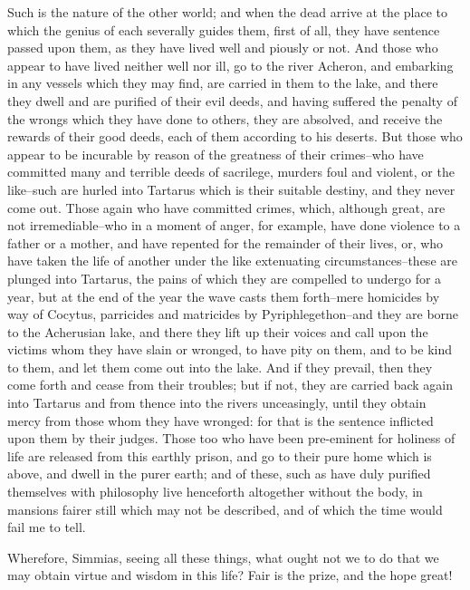 Such is the nature of the other world; and when the dead arrive at the
place to which the genius of each severally guides them, first of all,
they have sentence passed upon them, as they have lived well and piously
or not. And those who appear to have lived neither well nor ill, go to
the river Acheron, and embarking in any vessels which they may find, are
carried in them to the lake, and there they dwell and are purified of
their evil deeds, and having suffered the penalty of the wrongs which
they have done to others, they are absolved, and receive the rewards of
their good deeds, each of them according to his deserts. But those who
appear to be incurable by reason of the greatness of their crimes--who
have committed many and terrible deeds of sacrilege, murders foul and
violent, or the like--such are hurled into Tartarus which is their
suitable destiny, and they never come out. Those again who have
committed crimes, which, although great, are not irremediable--who in
a moment of anger, for example, have done violence to a father or a
mother, and have repented for the remainder of their lives, or, who
have taken the life of another under the like extenuating
circumstances--these are plunged into Tartarus, the pains of which they
are compelled to undergo for a year, but at the end of the year the
wave casts them forth--mere homicides by way of Cocytus, parricides and
matricides by Pyriphlegethon--and they are borne to the Acherusian lake,
and there they lift up their voices and call upon the victims whom they
have slain or wronged, to have pity on them, and to be kind to them,
and let them come out into the lake. And if they prevail, then they come
forth and cease from their troubles; but if not, they are carried back
again into Tartarus and from thence into the rivers unceasingly, until
they obtain mercy from those whom they have wronged: for that is the
sentence inflicted upon them by their judges. Those too who have been
pre-eminent for holiness of life are released from this earthly prison,
and go to their pure home which is above, and dwell in the purer earth;
and of these, such as have duly purified themselves with philosophy live
henceforth altogether without the body, in mansions fairer still which
may not be described, and of which the time would fail me to tell.

Wherefore, Simmias, seeing all these things, what ought not we to do
that we may obtain virtue and wisdom in this life? Fair is the prize,
and the hope great!

